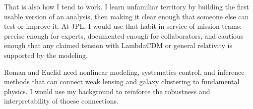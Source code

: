 \documentclass[11pt,letterpaper,sans]{moderncv}
\begin{document}
That is also how I tend to work. I learn unfamiliar territory by building the first usable version of an analysis, then making it clear enough that someone else can test or improve it. At JPL, I would use that habit in service of mission teams: precise enough for experts, documented enough for collaborators, and cautious enough that any claimed tension with LambdaCDM or general relativity is supported by the modeling.

Roman and Euclid need nonlinear modeling, systematics control, and inference methods that can connect weak lensing and galaxy clustering to fundamental physics. I would use my background to reinforce the robustness and interpretability of thoese connections.
\end{document}
